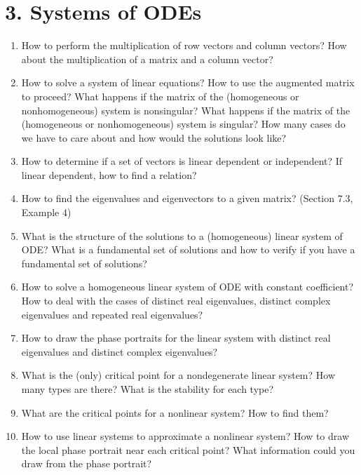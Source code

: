 \documentclass[11pt]{article}
\begin{document}
\section*{3. Systems of ODEs}
\begin{enumerate}
\item How to perform the multiplication of row vectors and column vectors? How about the multiplication of a matrix and a column vector? 
\item How to solve a system of linear equations? How to use the augmented matrix to proceed?
What happens if the matrix of the (homogeneous or nonhomogeneous) system is nonsingular? What happens if the matrix of the (homogeneous or nonhomogeneous) system is singular? How many cases do we have to care about and how would the solutions look like? 
\item How to determine if a set of vectors is linear dependent or independent? If linear dependent, how to find a relation? 
\item How to find the eigenvalues and eigenvectors to a given matrix? (Section 7.3, Example
4)
\item What is the structure of the solutions to a (homogeneous) linear system of ODE? What
is a fundamental set of solutions and how to verify if you have a fundamental set of
solutions? 
\item How to solve a homogeneous linear system of ODE with constant coefficient? How to
deal with the cases of distinct real eigenvalues, distinct complex eigenvalues and repeated real eigenvalues? 
\item How to draw the phase portraits for the linear system with distinct real eigenvalues and distinct complex eigenvalues? 
\item What is the (only) critical point for a nondegenerate linear system? How many types are there? What is the stability for each type? 
\item What are the critical points for a nonlinear system? How to find them? 
\item How to use linear systems to approximate a nonlinear system? How to draw the local phase portrait near each critical point? What information could you draw from the phase portrait? 
\end{enumerate}
\end{document}
